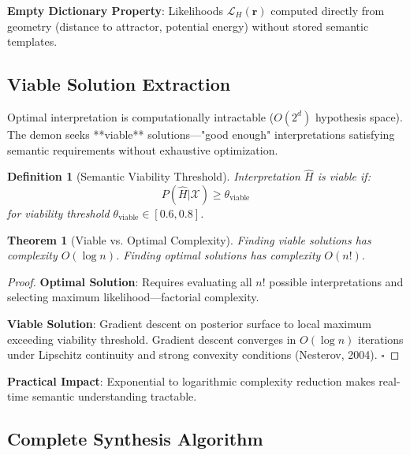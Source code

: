 \documentclass[12pt,a4paper]{article}
\newtheorem{theorem}{Theorem}
\newtheorem{definition}{Definition}
\begin{document}
\textbf{Empty Dictionary Property}: Likelihoods $\mathcal{L}_H(\mathbf{r})$ computed directly from geometry (distance to attractor, potential energy) without stored semantic templates.

\subsection{Viable Solution Extraction}

Optimal interpretation is computationally intractable ($O(2^d)$ hypothesis space). The demon seeks **viable** solutions—"good enough" interpretations satisfying semantic requirements without exhaustive optimization.

\begin{definition}[Semantic Viability Threshold]
Interpretation $\hat{H}$ is viable if:
\begin{equation}
P(\hat{H} | \mathcal{X}) \geq \theta_{\text{viable}}
\end{equation}
for viability threshold $\theta_{\text{viable}} \in [0.6, 0.8]$.
\end{definition}

\begin{theorem}[Viable vs. Optimal Complexity]
Finding viable solutions has complexity $O(\log n)$. Finding optimal solutions has complexity $O(n!)$.
\end{theorem}

\begin{proof}
\textbf{Optimal Solution}: Requires evaluating all $n!$ possible interpretations and selecting maximum likelihood—factorial complexity.

\textbf{Viable Solution}: Gradient descent on posterior surface to local maximum exceeding viability threshold. Gradient descent converges in $O(\log n)$ iterations under Lipschitz continuity and strong convexity conditions (Nesterov, 2004). $\square$
\end{proof}

\textbf{Practical Impact}: Exponential to logarithmic complexity reduction makes real-time semantic understanding tractable.

\subsection{Complete Synthesis Algorithm}
\end{document}

